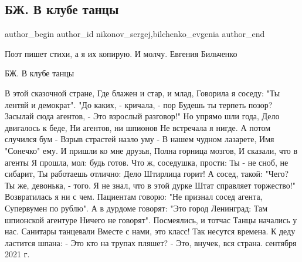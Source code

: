  
 
 
 
 
 
\subsection{БЖ. В клубе танцы}
\label{sec:10_09_2021.fb.nikonov_sergej.1.bilchenko_v_klube_tancy}
 
\ifcmt
 author_begin
   author_id nikonov_sergej,bilchenko_evgenia
 author_end
\fi

Поэт пишет стихи, а я их копирую. И молчу. 
Евгения Бильченко

\begin{center}
{\Large БЖ. В клубе танцы}
\end{center}


\begin{multicols}{2}
\obeycr
В этой сказочной стране,
Где блажен и стар, и млад,
Говорила я соседу:
"Ты лентяй и демократ".
\smallskip
"До каких, - кричала, - пор
Будешь ты терпеть позор?
Засылай сюда агентов, -
Это взрослый разговор!"
\smallskip
Но упрямо шли года,
Дело двигалось к беде,
Ни агентов, ни шпионов
Не встречала я нигде.
\smallskip
А потом случился бум -
Взрыв страстей назло уму -
В нашем чудном лазарете,
Имя "Сонечко" ему.
\smallskip
И пришли ко мне друзья,
Полна горница мозгов,
И сказали, что в агенты
Я прошла, мол: будь готов.
\smallskip
Что ж, соседушка, прости:
Ты - не сноб, не сибарит,
Ты работаешь отлично:
Дело Штирлица горит!
\smallskip
А сосед, такой: "Чего?
Ты же, девонька, - того.
Я не знал, что в этой дурке
Штат справляет торжество!"
\smallskip
Возвратилась я ни с чем.
Пациентам говорю:
"Не признал сосед агента,
Супервумен по рублю".
\smallskip
А в дурдоме говорят:
"Это город Ленинград:
Там шпионской агентуре
Ничего не говорят".
\smallskip
Посмеялись, и тотчас
Танцы начались у нас.
Санитары танцевали
Вместе с нами, это класс!
\smallskip
Так несутся времена.
К деду ластится шпана:
- Это кто на трупах пляшет?
- Это, внучек, вся страна.
 сентября 2021 г.
\restorecr
\end{multicols}

